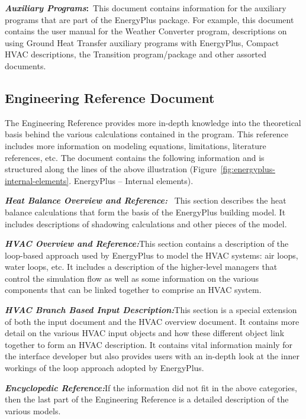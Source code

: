 \textbf{\emph{Auxiliary Programs}:}~This document contains information for the auxiliary programs that are part of the EnergyPlus package. For example, this document contains the user manual for the Weather Converter program, descriptions on using Ground Heat Transfer auxiliary programs with EnergyPlus, Compact HVAC descriptions, the Transition program/package and other assorted documents.

\subsection{Engineering Reference Document}\label{engineering-reference-document}

The Engineering Reference provides more in-depth knowledge into the theoretical basis behind the various calculations contained in the program. This reference includes more information on modeling equations, limitations, literature references, etc. The document contains the following information and is structured along the lines of the above illustration (Figure~\ref{fig:energyplus-internal-elements}. EnergyPlus -- Internal elements).

\textbf{\emph{Heat Balance Overview and Reference:}}~ This section describes the heat balance calculations that form the basis of the EnergyPlus building model. It includes descriptions of shadowing calculations and other pieces of the model.

\textbf{\emph{HVAC Overview and Reference:}}This section contains a description of the loop-based approach used by EnergyPlus to model the HVAC systems: air loops, water loops, etc. It includes a description of the higher-level managers that control the simulation flow as well as some information on the various components that can be linked together to comprise an HVAC system.

\textbf{\emph{HVAC Branch Based Input Description:}}This section is a special extension of both the input document and the HVAC overview document. It contains more detail on the various HVAC input objects and how these different object link together to form an HVAC description. It contains vital information mainly for the interface developer but also provides users with an in-depth look at the inner workings of the loop approach adopted by EnergyPlus.

\textbf{\emph{Encyclopedic Reference:}}If the information did not fit in the above categories, then the last part of the Engineering Reference is a detailed description of the various models.


